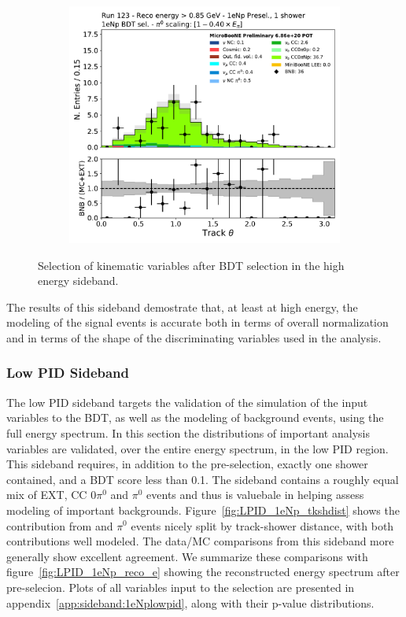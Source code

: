 \begin{figure}[H]
\begin{center}
    \begin{subfigure}{0.4\textwidth}
    \includegraphics[width=1.00\textwidth]{Sidebands/Figures/1eNp/HighEnergy/HiEext_NPOneShr_NPBDT_pi0e040/trk_theta.pdf}
    \end{subfigure}
\caption{\label{fig:sb:1eNp:he:BDT:kinvars} Selection of kinematic variables after BDT selection in the \npsel high energy sideband.}
    \end{center}
\end{figure}


The results of this sideband demostrate that, at least at high energy, the modeling of the \npsel signal events is accurate both in terms of overall normalization and in terms of the shape of the discriminating variables used in the analysis.

\subsubsection{Low PID Sideband}
\label{sec:sideband:1eNp:lowpid}
The low PID sideband targets the validation of the simulation of the input variables to the BDT, as well as the modeling of background events, using the full energy spectrum.
In this section the distributions of important analysis variables are validated, over the entire energy spectrum, in the low PID region.
This sideband requires, in addition to the \nue pre-selection, exactly one shower contained, and a BDT score less than 0.1. The sideband contains a roughly equal mix of EXT, \numu CC 0$\pi^0$ and \numu $\pi^0$ events and thus is valuebale in helping assess modeling of important backgrounds. Figure~\ref{fig:LPID_1eNp_tkshdist} shows the contribution from \numu and $\pi^0$ events nicely split by track-shower distance, with both contributions well modeled. The data/MC comparisons from this sideband more generally show excellent agreement. We summarize these comparisons with figure~\ref{fig:LPID_1eNp_reco_e} showing the reconstructed energy spectrum after pre-selecion. Plots of all variables input to the \nue selection are presented in appendix~\ref{app:sideband:1eNplowpid}, along with their p-value distributions.

